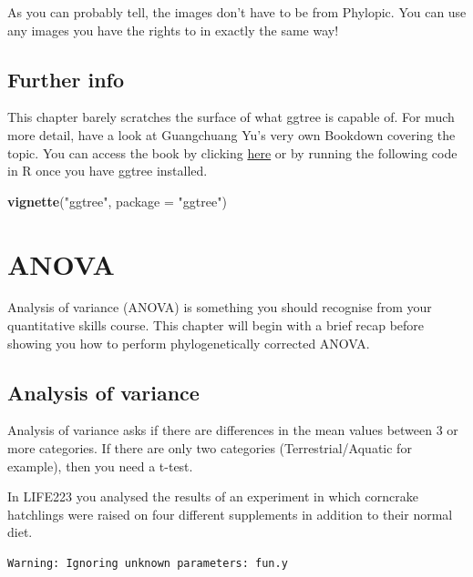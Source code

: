 \documentclass[
]{book}
\newenvironment{Shaded}{\begin{snugshade}}{\end{snugshade}}
\newcommand{\DataTypeTok}[1]{\textcolor[rgb]{0.13,0.29,0.53}{#1}}
\newcommand{\KeywordTok}[1]{\textcolor[rgb]{0.13,0.29,0.53}{\textbf{#1}}}
\newcommand{\NormalTok}[1]{#1}
\newcommand{\StringTok}[1]{\textcolor[rgb]{0.31,0.60,0.02}{#1}}
\begin{document}
As you can probably tell, the images don't have to be from Phylopic. You can use any images you have the rights to in exactly the same way!

\hypertarget{further-info}{%
\section{Further info}\label{further-info}}

This chapter barely scratches the surface of what ggtree is capable of. For much more detail, have a look at Guangchuang Yu's very own Bookdown covering the topic. You can access the book by clicking \href{https://yulab-smu.github.io/treedata-book/}{here} or by running the following code in R once you have ggtree installed.

\begin{Shaded}
\begin{Highlighting}[]
\KeywordTok{vignette}\NormalTok{(}\StringTok{"ggtree"}\NormalTok{, }\DataTypeTok{package =} \StringTok{"ggtree"}\NormalTok{)}
\end{Highlighting}
\end{Shaded}

\hypertarget{anova}{%
\chapter{ANOVA}\label{anova}}

Analysis of variance (ANOVA) is something you should recognise from your quantitative skills course. This chapter will begin with a brief recap before showing you how to perform phylogenetically corrected ANOVA.

\hypertarget{analysis-of-variance}{%
\section{Analysis of variance}\label{analysis-of-variance}}

Analysis of variance asks if there are differences in the mean values between 3 or more categories. If there are only two categories (Terrestrial/Aquatic for example), then you need a t-test.

In LIFE223 you analysed the results of an experiment in which corncrake hatchlings were raised on four different supplements in addition to their normal diet.

\begin{verbatim}
Warning: Ignoring unknown parameters: fun.y
\end{verbatim}
\end{document}
